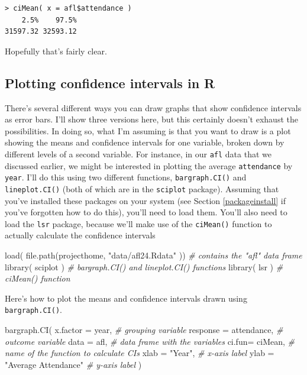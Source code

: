 \documentclass[
]{book}
\newenvironment{Shaded}{\begin{snugshade}}{\end{snugshade}}
\newcommand{\AttributeTok}[1]{\textcolor[rgb]{0.77,0.63,0.00}{#1}}
\newcommand{\CommentTok}[1]{\textcolor[rgb]{0.56,0.35,0.01}{\textit{#1}}}
\newcommand{\FunctionTok}[1]{\textcolor[rgb]{0.00,0.00,0.00}{#1}}
\newcommand{\NormalTok}[1]{#1}
\newcommand{\StringTok}[1]{\textcolor[rgb]{0.31,0.60,0.02}{#1}}
\begin{document}
\begin{verbatim}
> ciMean( x = afl$attendance )
    2.5%    97.5% 
31597.32 32593.12 
\end{verbatim}

Hopefully that's fairly clear.

\hypertarget{ciplots}{%
\subsection{Plotting confidence intervals in R}\label{ciplots}}

There's several different ways you can draw graphs that show confidence intervals as error bars. I'll show three versions here, but this certainly doesn't exhaust the possibilities. In doing so, what I'm assuming is that you want to draw is a plot showing the means and confidence intervals for one variable, broken down by different levels of a second variable. For instance, in our \texttt{afl} data that we discussed earlier, we might be interested in plotting the average \texttt{attendance} by \texttt{year}. I'll do this using two different functions, \texttt{bargraph.CI()} and \texttt{lineplot.CI()} (both of which are in the \texttt{sciplot} package). Assuming that you've installed these packages on your system (see Section \ref{packageinstall} if you've forgotten how to do this), you'll need to load them. You'll also need to load the \texttt{lsr} package, because we'll make use of the \texttt{ciMean()} function to actually calculate the confidence intervals

\begin{Shaded}
\begin{Highlighting}[]
\FunctionTok{load}\NormalTok{( }\FunctionTok{file.path}\NormalTok{(projecthome, }\StringTok{"data/afl24.Rdata"}\NormalTok{ ))  }\CommentTok{\# contains the "afl" data frame}
\FunctionTok{library}\NormalTok{( sciplot )     }\CommentTok{\# bargraph.CI() and lineplot.CI() functions}
\FunctionTok{library}\NormalTok{( lsr )         }\CommentTok{\# ciMean() function}
\end{Highlighting}
\end{Shaded}

Here's how to plot the means and confidence intervals drawn using \texttt{bargraph.CI()}.

\begin{Shaded}
\begin{Highlighting}[]
\FunctionTok{bargraph.CI}\NormalTok{( }\AttributeTok{x.factor =}\NormalTok{ year,            }\CommentTok{\# grouping variable }
              \AttributeTok{response =}\NormalTok{ attendance,      }\CommentTok{\# outcome variable}
              \AttributeTok{data =}\NormalTok{ afl,                 }\CommentTok{\# data frame with the variables}
              \AttributeTok{ci.fun=}\NormalTok{ ciMean,             }\CommentTok{\# name of the function to calculate CIs}
              \AttributeTok{xlab =} \StringTok{"Year"}\NormalTok{,              }\CommentTok{\# x{-}axis label}
              \AttributeTok{ylab =} \StringTok{"Average Attendance"} \CommentTok{\# y{-}axis label}
\NormalTok{ )}
\end{Highlighting}
\end{Shaded}
\end{document}
